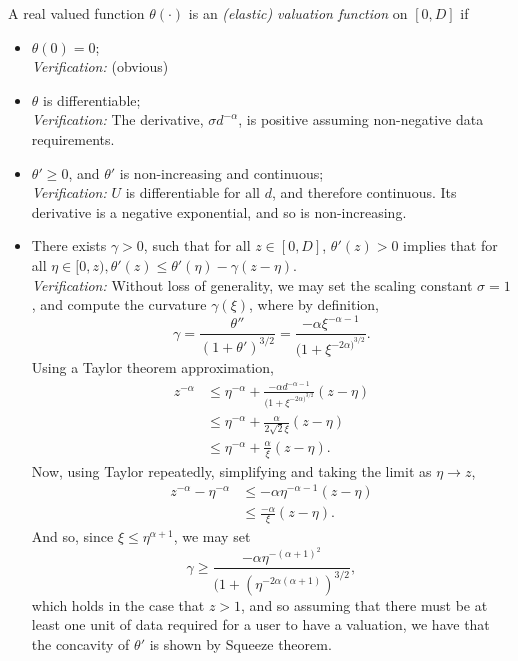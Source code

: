 \documentclass[12pt]{article}
\theoremstyle{definition}
\begin{document}
\begin{multicols}{2}
A real valued function $\theta(\cdot)$ is an \emph{(elastic) valuation
function} on $[0, D]$ if 
\begin{itemize}
    \item $\theta(0) = 0$; \\
        \emph{Verification:} (obvious)
    \item $\theta$ is differentiable; \\
        \emph{Verification:} The derivative, $\sigma d^{-\alpha}$, is positive assuming non-negative
data requirements.
    \item $\theta ' \ge 0$, and $\theta '$ is non-increasing and continuous; \\
        \emph{Verification:} $U$ is differentiable for all $d$, and therefore
continuous. Its derivative is a negative exponential, and so is non-increasing.
    \item There exists $\gamma > 0$, such that for all $z \in [0,D]$, $\theta
'(z) > 0$ implies that for all $\eta \in [0, z), \theta '(z) \le \theta '(\eta)
- \gamma(z - \eta)$. \\
        \emph{Verification:} Without loss of generality, we may set the scaling
constant $\sigma=1$, and compute the curvature $\gamma(\xi)$, where by definition,
$$
    \gamma = \frac{\theta''}{(1+\theta')^{3/2}} = \frac{-\alpha
\xi^{-\alpha-1}}{(1+\xi^{-2\alpha)^{3/2}}}.
$$
Using a Taylor theorem approximation,
\begin{align*}
    z^{-\alpha} &\le \eta^{-\alpha} + \frac{-\alpha
d^{-\alpha-1}}{(1+\xi^{-2\alpha)^{3/2}}}(z-\eta) \\
    & \le \eta^{-\alpha} +
\frac{\alpha}{2\sqrt{2} \xi}(z-\eta)  \\
    &\le \eta^{-\alpha} +
\frac{\alpha}{\xi}(z-\eta).
\end{align*}
Now, using Taylor repeatedly, simplifying and taking the limit as $\eta \rightarrow z$,
\begin{align*}
    z^{-\alpha} - \eta^{-\alpha} &\le -\alpha\eta^{-\alpha-1}(z-\eta) \\
    & \le \frac{-\alpha}{\xi}(z-\eta).
\end{align*}
And so, since $\xi \le \eta^{\alpha+1}$,
we may set
$$
    \gamma \ge
\frac{-\alpha\eta^{-(\alpha+1)^2}}{\big(1+(\eta^{-2\alpha(\alpha+1)})^{3/2}},
$$
which holds in the case that $z > 1$, and so assuming that there must be at least one
unit of data required for a user to have
a valuation,  we have that the concavity of $\theta'$ is shown by Squeeze theorem.
\end{itemize}


\end{multicols}
\end{document}
